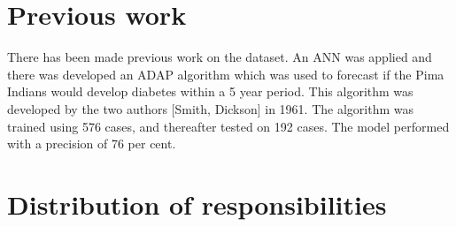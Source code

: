 \section{Previous work}
There has been made previous work on the dataset.
An ANN was applied and there was developed an ADAP algorithm
which was used to forecast if the Pima Indians would develop diabetes within a 5 year period.
This algorithm was developed by the two authors [Smith, Dickson] in 1961.
The algorithm was trained using 576 cases, and thereafter tested on 192 cases. The model performed
with a precision of 76 per cent.




\appendix
\section{Distribution of responsibilities}
